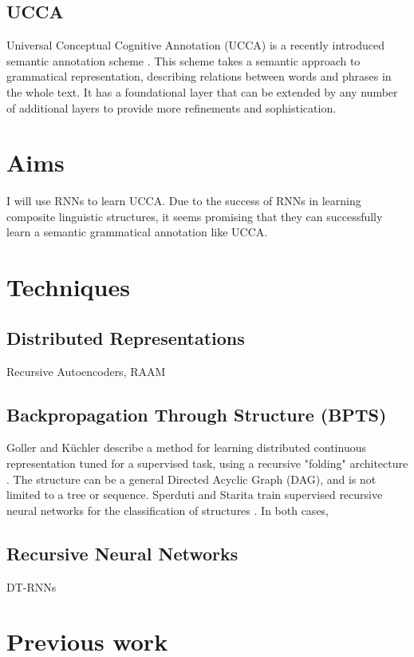 \documentclass[11pt]{article}
\begin{document}
\subsection{UCCA}

Universal Conceptual Cognitive Annotation (UCCA) is a recently introduced semantic annotation scheme \cite{abend2013universal}. This scheme takes a semantic approach to grammatical representation, describing relations between words and phrases in the whole text. It has a foundational layer that can be extended by any number of additional layers to provide more refinements and sophistication.


\section{Aims}

I will use RNNs to learn UCCA. Due to the success of RNNs in learning composite linguistic structures, it seems promising that they can successfully learn a semantic grammatical annotation like UCCA.


\section{Techniques}

\subsection{Distributed Representations}

Recursive Autoencoders, RAAM

\subsection{Backpropagation Through Structure (BPTS)}

Goller and K{\"u}chler describe a method for learning distributed continuous representation tuned for a supervised task, using a recursive "folding" architecture \cite{goller1996learning}. The structure can be a general Directed Acyclic Graph (DAG), and is not limited to a tree or sequence. Sperduti and Starita train supervised recursive neural networks for the classification of structures \cite{sperduti1997supervised}. In both cases, 

\subsection{Recursive Neural Networks}

DT-RNNs


\section{Previous work}

\cite{beka2013thesis}


{}

\end{document}
